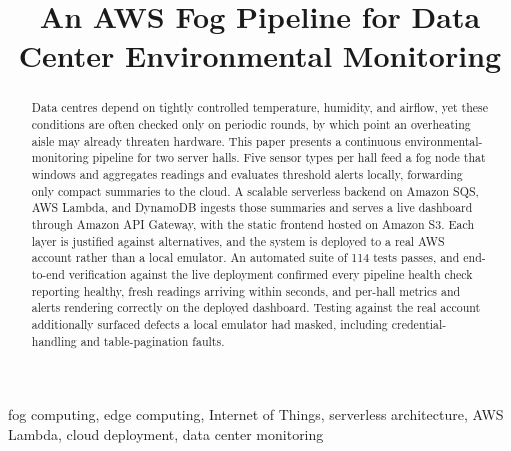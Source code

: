 \documentclass[conference]{IEEEtran}
\begin{document}
\title{An AWS Fog Pipeline for Data Center Environmental Monitoring}

\author{
}

\maketitle

\begin{abstract}
Data centres depend on tightly controlled temperature, humidity, and airflow, yet these conditions are often checked only on periodic rounds, by which point an overheating aisle may already threaten hardware. This paper presents a continuous environmental-monitoring pipeline for two server halls. Five sensor types per hall feed a fog node that windows and aggregates readings and evaluates threshold alerts locally, forwarding only compact summaries to the cloud. A scalable serverless backend on Amazon SQS, AWS Lambda, and DynamoDB ingests those summaries and serves a live dashboard through Amazon API Gateway, with the static frontend hosted on Amazon S3. Each layer is justified against alternatives, and the system is deployed to a real AWS account rather than a local emulator. An automated suite of 114 tests passes, and end-to-end verification against the live deployment confirmed every pipeline health check reporting healthy, fresh readings arriving within seconds, and per-hall metrics and alerts rendering correctly on the deployed dashboard. Testing against the real account additionally surfaced defects a local emulator had masked, including credential-handling and table-pagination faults.
\end{abstract}

\begin{IEEEkeywords}
fog computing, edge computing, Internet of Things, serverless architecture, AWS Lambda, cloud deployment, data center monitoring
\end{IEEEkeywords}
\end{document}
